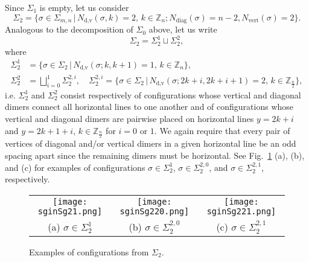 \documentclass[12pt,reqno]{amsart}
\numberwithin{equation}{section}
\newcommand{\Z}{{\mathbb Z}}
\newcommand{\sg}{\sigma}
\begin{document}
Since $\Sigma_1$ is empty, let us consider
\[\Sigma_2=\{\sg\in\Sigma_{m,n}\,|\, N_{\textrm{d,v}}(\sg,k)=2,
 \, k\in\Z_n; N_{\textrm{diag}}(\sg)=n-2, N_{\textrm{vert}}(\sg)=2\}.\]
Analogous to the decomposition of $\Sigma_0$ above, let us write 
\begin{equation}\label{s2decomp}
\Sigma_2=\Sigma_2^1\sqcup \Sigma_2^2,
\end{equation}
where 
\begin{equation}
\begin{aligned}
\Sigma_2^1&=\{\sigma\in\Sigma_2\,|\,N_{\textrm{d,v}}(\sg;k,k+1)=1, \,k\in \mathbb Z_n\},\\
\Sigma_2^2&=\bigsqcup_{i=0}^1\Sigma_2^{2,i},\quad \Sigma_2^{2,i}=\{\sigma\in\Sigma_2\,|\,N_{\textrm{d,v}}(\sg;2k+i,2k+i+1)=2,\, k\in \mathbb Z_{\frac{n}{2}}\},
\end{aligned}
\end{equation}
i.e. $\Sigma_2^1$ and $\Sigma_2^2$ consist respectively of configurations whose vertical and diagonal dimers connect all horizontal lines to one another and of configurations whose vertical and diagonal dimers are pairwise placed on horizontal lines $y=2k+i$ and $y=2k+1+i$, $k\in\mathbb Z_{\frac{n}{2}}$ for $i=0$ or $1$. We again require that every pair of vertices of diagonal and/or vertical dimers in a given horizontal line be an odd spacing apart since the remaining dimers must be horizontal. See Fig.\ \ref{F7} (a), (b), and (c) for examples of configurations $\sg\in\Sigma_2^1$, $\sg\in\Sigma_2^{2,0}$, and $\sg\in\Sigma_2^{2,1}$, respectively.

\begin{figure}[h]
\begin{tabular}{c c c}
\texttt{[image: sginSg21.png]}&\hspace{.45in} \texttt{[image: sginSg220.png]}&\hspace{.45in}
\texttt{[image: sginSg221.png]}\\
(a) $\sg\in\Sigma_2^1$ &\hspace{.2in} (b) $\sg\in\Sigma_2^{2,0}$ &\hspace{.2in} (c) $\sg\in\Sigma_2^{2,1}$
\end{tabular}
\caption{Examples of configurations from $\Sigma_2$.}
\label{F7}
\end{figure}
\end{document}
